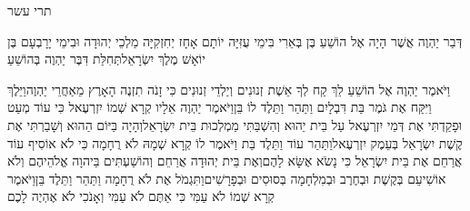 \documentclass[../main/main.tex]{subfiles}
\begin{document}
\thispagestyle{empty}
\Incipit{}תרי עשר
\cleardoublepage
{}
\RTLmulticolcolumns
\begin{multicols*}{\ncols}
דְּבַר יַהְוֶה אֲשֶׁר הָיָה אֶל הוֹשֵׁעַ בֶּן בְּאֵרִי בִּימֵי עֻזִּיָּה יוֹתָם אָחָז יְחִזְקִיָּה מַלְכֵי יְהוּדָה וּבִימֵי יָרָבְעָם בֶּן יוֹאָשׁ מֶלֶךְ יִשְׂרָאֵל\PreVerseSpace{}תְּחִלַּת דִּבֶּר יַהְוֶה בְּהוֹשֵׁעַ\OpenSection{}\par
וַיֹּאמֶר יַהְוֶה אֶל הוֹשֵׁעַ לֵךְ קַח לְךָ אֵשֶׁת זְנוּנִים וְיַלְדֵי זְנוּנִים כִּי זָנֹה תִזְנֶה הָאָרֶץ מֵאַחֲרֵי יַהְוֶה\PreVerseSpace{}וַיֵּלֶךְ וַיִּקַּח אֶת גֹּמֶר בַּת דִּבְלָיִם וַתַּהַר וַתֵּלֶד לוֹ בֵּן\PreVerseSpace{}וַיֹּאמֶר יַהְוֶה אֵלָיו קְרָא שְׁמוֹ יִזְרְעֶאל כִּי עוֹד מְעַט וּפָקַדְתִּי אֶת דְּמֵי יִזְרְעֶאל עַל בֵּית יֵהוּא וְהִשְׁבַּתִּי מַמְלְכוּת בֵּית יִשְׂרָאֵל\PreVerseSpace{}וְהָיָה בַּיּוֹם הַהוּא וְשָׁבַרְתִּי אֶת קֶשֶׁת יִשְׂרָאֵל בְּעֵמֶק יִזְרְעֶאל\PreVerseSpace{}וַתַּהַר עוֹד וַתֵּלֶד בַּת וַיֹּאמֶר לוֹ קְרָא שְׁמָהּ לֹא רֻחָמָה כִּי לֹא אוֹסִיף עוֹד אֲרַחֵם אֶת בֵּית יִשְׂרָאֵל כִּי נָשֹׂא אֶשָּׂא לָהֶם\PreVerseSpace{}וְאֶת בֵּית יְהוּדָה אֲרַחֵם וְהוֹשַׁעְתִּים בַּיהוָה אֱלֹהֵיהֶם וְלֹא אוֹשִׁיעֵם בְּקֶשֶׁת וּבְחֶרֶב וּבְמִלְחָמָה בְּסוּסִים וּבְפָרָשִׁים\PreVerseSpace{}וַתִּגְמֹל אֶת לֹא רֻחָמָה וַתַּהַר וַתֵּלֶד בֵּן\PreVerseSpace{}וַיֹּאמֶר קְרָא שְׁמוֹ לֹא עַמִּי כִּי אַתֶּם לֹא עַמִּי וְאָנֹכִי לֹא אֶהְיֶה לָכֶם\OpenSection{}\par

\end{multicols*}
\end{document}
